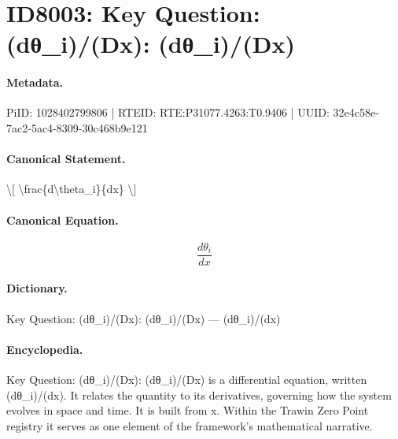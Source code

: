 \section*{ID8003: Key Question: (dθ\_i)/(Dx): (dθ\_i)/(Dx)}
\paragraph{Metadata.}
PiID: 1028402799806 | RTEID: RTE:P31077.4263:T0.9406 | UUID: 32e4c58e-7ac2-5ac4-8309-30c468b9e121

\paragraph{Canonical Statement.}
\textbackslash{}[ \textbackslash{}frac\{d\textbackslash{}theta\_i\}\{dx\} \textbackslash{}]

\paragraph{Canonical Equation.}
\[
\frac{d\theta_i}{dx}
\]

\paragraph{Dictionary.}
Key Question: (dθ\_i)/(Dx): (dθ\_i)/(Dx) — (dθ\_i)/(dx)

\paragraph{Encyclopedia.}
Key Question: (dθ\_i)/(Dx): (dθ\_i)/(Dx) is a differential equation, written (dθ\_i)/(dx). It relates the quantity to its derivatives, governing how the system evolves in space and time. It is built from x. Within the Trawin Zero Point registry it serves as one element of the framework's mathematical narrative.
